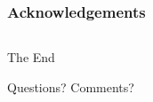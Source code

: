 \documentclass[
  11pt, %
  xcolor=dvipsnames
]{beamer}
\begin{document}

\begin{frame}
	\frametitle{Acknowledgements}

	\begin{columns}[t] %
		\begin{column}{0.45\textwidth} %
		\end{column}
		\begin{column}{0.5\textwidth} %
		\end{column}
	\end{columns}
\end{frame}


\begin{frame}[plain] %
	\begin{center}
		{\Huge The End}

		\bigskip\bigskip %

		{\LARGE Questions? Comments?}
	\end{center}
\end{frame}

\end{document}
